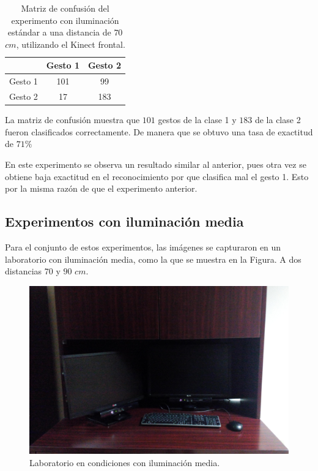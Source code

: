\begin{itemize}
\begin{table}[h!] 
\begin{center}
\begin{tabular}{ r || c | c |} 
        & Gesto 1 & Gesto 2 \\ \hline \hline  
Gesto 1 &  101   & 99      \\ \hline  
Gesto 2 &  17    & 183     \\   
\end{tabular}
\end{center} 
\caption{Matriz de confusión del experimento con iluminación estándar a una distancia de $70$ $cm$, utilizando el Kinect frontal.}
\label{table:90LK1}
\end{table} 

La matriz de confusión muestra que $101$ gestos de la clase 1 y $183$ de la clase 2 fueron clasificados correctamente. De manera que se obtuvo una tasa de exactitud de $71 \%$  

\end{itemize}

En este experimento se observa un resultado similar al anterior, pues otra vez se obtiene baja exactitud en el reconocimiento por que clasifica mal el gesto 1. Esto por la misma razón de que el experimento anterior.



\subsection{Experimentos con iluminación media} 
Para el conjunto de estos experimentos, las imágenes se capturaron en un laboratorio con iluminación media, como la que se muestra en la Figura. A dos distancias $70$ y $90$ $cm$.  

\begin{figure}[h!]
\begin{center} 
\includegraphics[scale=0.09]{./Figures/mediailuminacion.jpg}
\end{center}
\caption{Laboratorio en condiciones con iluminación media.}
\label{fig:LabMedioIluminado} 
\end{figure}  


